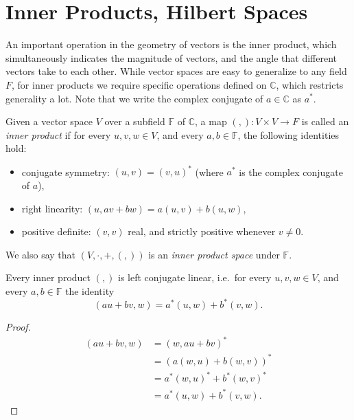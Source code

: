 \section{Inner Products, Hilbert Spaces}\label{inner-products}
An important operation in the geometry of vectors is the inner product, which simultaneously indicates the magnitude of vectors, and the angle that different vectors take to each other. While vector spaces are easy to generalize to any field $F$, for inner products we require specific operations defined on $\mathbb{C}$, which restricts generality a lot. Note that we write the complex conjugate of $a \in \mathbb{C}$ as $a^*$.

\begin{define}
	Given a vector space $V$ over a subfield $\mathbb{F}$ of $\mathbb{C}$, a map $(,): V \times V \to F$ is called an \emph{inner product} if for every $u, v, w \in V$, and every $a, b \in \mathbb{F}$, the following identities hold:
	\begin{itemize}
		\item conjugate symmetry: $(u, v) = (v, u)^*$ (where $a^*$ is the complex conjugate of $a$),
		\item right linearity: $(u, av+bw) = a(u, v) + b(u, w)$,
		\item positive definite: $(v, v)$ real, and strictly positive whenever $v \neq 0$.
	\end{itemize}
	We also say that $(V, \cdot, +, (,))$ is an \emph{inner product space} under $\mathbb{F}$.
\end{define}

\begin{prop}
	Every inner product $(,)$ is left conjugate linear, i.e.\ for every $u, v, w \in V$, and every $a, b \in \mathbb{F}$ the identity
	\[(au+bv,w) = a^*(u,w) + b^*(v,w).\]
\end{prop}
\begin{proof}
	\begin{align*}
		(au+bv,w)
		&= (w,au+bv)^*
		\\&= (a(w,u)+b(w,v))^*
		\\&= a^*(w,u)^*+b^*(w,v)^*
		\\&= a^*(u,w)+b^*(v,w).
	\end{align*}
\end{proof}

